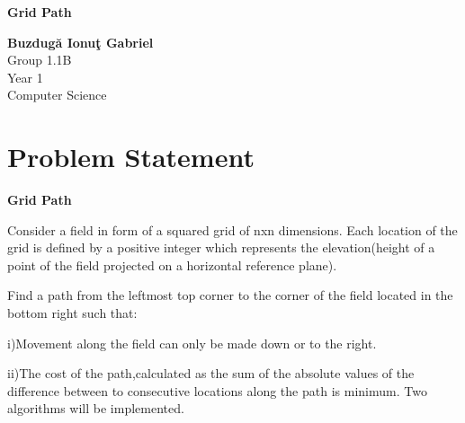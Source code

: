 \documentclass{article}
\begin{document}
\graphicspath{ {./images/} } 
\begin{titlepage}
 
   \begin{center}
   
       \vspace*{1cm}
       \Huge
       \textbf{Grid Path}

     
            
       \vspace{1 cm}
      \LARGE
       \textbf{Buzdug\u{a} Ionu\c{t} Gabriel}\\
       Group 1.1B\\
       Year 1\\
       Computer Science
       \vfill
            
      
            
       \vspace{0.8cm}
      
    
    \end{center}
  \end{titlepage}
\newpage

\section {\LARGE Problem Statement} \vspace*{1cm}
\LARGE \textbf{Grid Path} \vspace*{1cm}
\par Consider a field in form of a squared grid of nxn dimensions.
Each location of the grid is defined by a positive integer which represents 
the elevation(height of a point of the field projected on a  horizontal reference plane).
\par Find a path from the leftmost top corner to the corner of the field located in the bottom right
such that:
\par i)Movement along the field can only be made down or to the right.
\par ii)The cost of the path,calculated as the sum of the absolute values of the difference between to consecutive
locations along the path is minimum.
Two algorithms will be implemented.
\newpage
\end{document}
